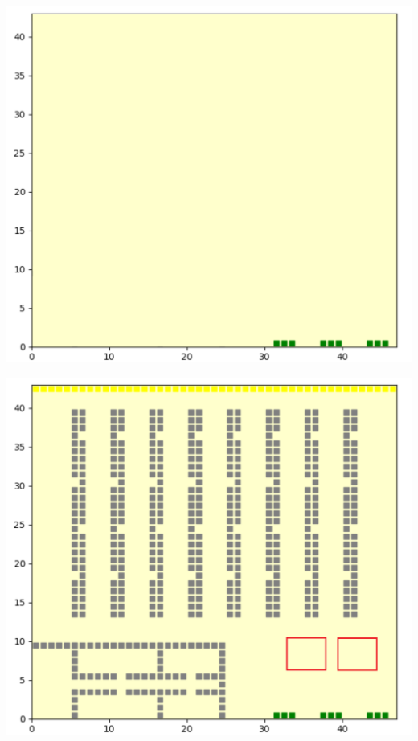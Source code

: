 \documentclass[12pt]{article}
\begin{document}
\vspace{1cm}
\begin{minipage}[ht]{0.45\linewidth}
\centering
\includegraphics[width=\textwidth]{Figures/Map/Gates.png}
\end{minipage}
\hspace{0.5cm}
\begin{minipage}[ht]{0.45\linewidth}
\centering
\includegraphics[width=\textwidth]{Figures/Map/WaitingArea.png}
\end{minipage}
\end{document}
